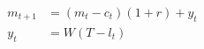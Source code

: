   \begin{align}
    m_{t+1} & = (m_t -c_t)(1+r) + y_t \label{eq:savings} \\
    y_t &= W(T-l_t) \label{eq:earnings}
  \end{align}
